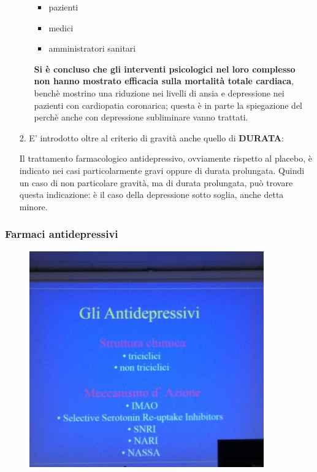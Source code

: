 \begin{itemize}
\begin{itemize}
\begin{itemize}
\item
  pazienti
\item
  medici
\item
  amministratori sanitari
\end{itemize}

\textbf{Si è concluso che gli interventi psicologici nel loro complesso
non hanno mostrato efficacia sulla mortalità totale cardiaca}, benchè
mostrino una riduzione nei livelli di ansia e depressione nei pazienti
con cardiopatia coronarica; questa è in parte la spiegazione del perchè
anche con depressione subliminare vanno trattati.
\end{itemize}

\item[2.]
  E' introdotto oltre al criterio di gravità anche quello di
  \textbf{DURATA}:

  Il trattamento farmacologico antidepressivo, ovviamente rispetto al
  placebo, è indicato nei casi particolarmente gravi oppure di durata
  prolungata. Quindi un caso di non particolare gravità, ma di durata
  prolungata, può trovare questa indicazione: è il caso della
  depressione sotto soglia, anche detta minore.
\end{itemize}

\subsubsection{Farmaci antidepressivi}

\begin{figure}[!ht]
\centering
	\includegraphics[width=0.9\textwidth]{03/image1.jpeg}
\end{figure}

